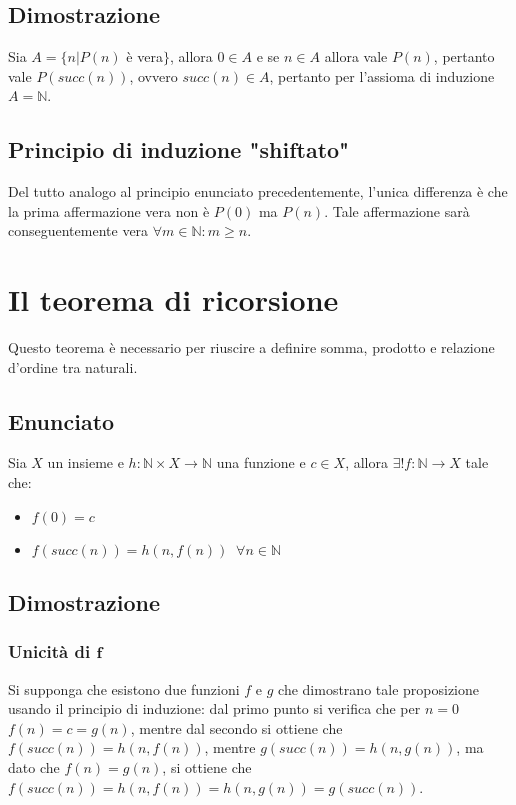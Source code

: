 \subsection{Dimostrazione}
Sia $A=\{n|P(n)$ \`e vera$\}$, allora $0\in A$ e se $n\in A$ allora vale $P(n)$, pertanto vale $P(succ(n))$, ovvero $succ(n)\in A$, pertanto per l'assioma di induzione $A=\mathbb{N}$.
\subsection{Principio di induzione "shiftato"}
Del tutto analogo al principio enunciato precedentemente, l'unica differenza \`e che la prima affermazione vera non \`e $P(0)$ ma $P(n)$. Tale affermazione sar\`a conseguentemente
vera $\forall m\in\mathbb{N}:m\ge n$.
\section{Il teorema di ricorsione}
Questo teorema \`e necessario per riuscire a definire somma, prodotto e relazione d'ordine tra naturali.
\subsection{Enunciato}
Sia $X$ un insieme e $h:\mathbb{N}\times X\rightarrow\mathbb{N}$ una funzione e $c\in X$, allora $\exists! f:\mathbb{N}\rightarrow X$ tale che:
\begin{itemize}
\item $f(0)=c$
\item $f(succ(n))=h(n,f(n))\;\;\forall n\in\mathbb{N}$
\end{itemize}
\subsection{Dimostrazione}
\subsubsection{Unicit\`a di $\mathbf{f}$}
Si supponga che esistono due funzioni $f$ e $g$ che dimostrano tale proposizione usando il principio di induzione: dal primo punto si verifica che per $n=0$ $f(n)=c=g(n)$, 
mentre dal secondo si ottiene che $f(succ(n))=h(n,f(n))$, mentre $g(succ(n))=h(n,g(n))$, ma dato che $f(n)=g(n)$, si ottiene che $f(succ(n))=h(n,f(n))=h(n,g(n))=g(succ(n))$.
